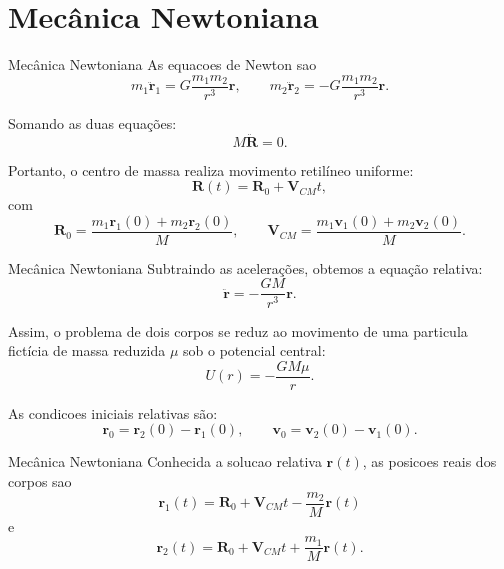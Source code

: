 \documentclass[10pt]{beamer}
\begin{document}
\section{Mecânica Newtoniana}
\begin{frame}{Mecânica Newtoniana}
    As equacoes de Newton sao
\begin{equation}
m_1\ddot{\bm r}_1
=G\frac{m_1m_2}{r^3}\bm r,
\qquad
m_2\ddot{\bm r}_2
=-G\frac{m_1m_2}{r^3}\bm r.
\end{equation}

Somando as duas equações:
\begin{equation}
M\ddot{\bm R}=0.
\end{equation}

Portanto, o centro de massa realiza movimento retilíneo uniforme:
\begin{equation}
\bm R(t)=\bm R_0+\bm V_{CM}t,
\end{equation}
com
\begin{equation}
\bm R_0=\frac{m_1\bm r_1(0)+m_2\bm r_2(0)}{M},
\qquad
\bm V_{CM}=\frac{m_1\bm v_1(0)+m_2\bm v_2(0)}{M}.
\end{equation}
\end{frame}

\begin{frame}{Mecânica Newtoniana}
    Subtraindo as acelerações, obtemos a equação relativa:
\begin{equation}
\ddot{\bm r}=-\frac{GM}{r^3}\bm r.
\end{equation}

Assim, o problema de dois corpos se reduz ao movimento de uma particula fictícia
de massa reduzida $\mu$ sob o potencial central:
\begin{equation}
U(r)=-\frac{GM\mu}{r}.
\end{equation}

As condicoes iniciais relativas são:
\begin{equation*}
\bm r_0=\bm r_2(0)-\bm r_1(0),
\qquad
\bm v_0=\bm v_2(0)-\bm v_1(0).
\end{equation*}
\end{frame}

\begin{frame}{Mecânica Newtoniana}
    Conhecida a solucao relativa $\bm r(t)$, as posicoes reais dos corpos sao
\begin{equation}
\boxed{
\bm r_1(t)=\bm R_0+\bm V_{CM}t-\frac{m_2}{M}\bm r(t)
}
\end{equation}
e
\begin{equation}
\boxed{
\bm r_2(t)=\bm R_0+\bm V_{CM}t+\frac{m_1}{M}\bm r(t)
}.
\end{equation}
\end{frame}
\end{document}
